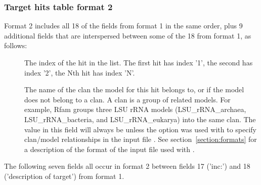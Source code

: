 \subsubsection{Target hits table format 2}
\label{tabular-format2}

Format 2 includes all 18 of the fields from format 1 in the same order, plus 9
additional fields that are interspersed between some of the 18 from
format 1, as follows:

\begin{description}

\item[] 
  The index of the hit in the list. The first hit has index '1', the
  second has index '2', the Nth hit has index 'N'.

\item[] 
  The name of the clan the model for this hit belongs to, or \ccode{-} if
  the model does not belong to a clan. A clan is a group of related
  models. For example, Rfam groups three LSU rRNA models
  (LSU\_rRNA\_archaea, LSU\_rRNA\_bacteria, and LSU\_rRNA\_eukarya)
  into the same clan. The value in this field will always be \ccode{-}
  unless the  option was used with
   to specify clan/model relationships in the input file
  . See section~\ref{section:formats} for a description of
  the format of the input file used with .

\end{description}

The following seven fields all occur in format 2 between fields 17
('inc:') and 18 ('description of target') from format 1. 

